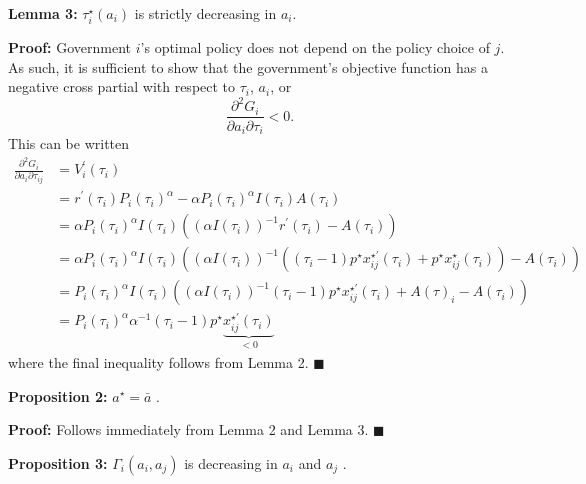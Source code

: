 \documentclass{puthesis}
\begin{document}
\textbf{Lemma 3:} \(\tau_i^\star(a_i)\) is strictly decreasing in
\(a_i\).

\textbf{Proof:} Government \(i\)'s optimal policy does not depend on the
policy choice of \(j\). As such, it is sufficient to show that the
government's objective function has a negative cross partial with
respect to \(\tau_i\), \(a_i\), or \[
\frac{\partial^2 G_i}{\partial a_i \partial \tau_{i}} < 0 .
\] This can be written \begin{align*}
\frac{\partial^2 G_i}{\partial a_i \partial \tau_{ij}} &= V_i^\prime(\tau_i) \\
&= r^\prime(\tau_i) P_i(\tau_i)^{\alpha} - \alpha P_i(\tau_i)^{\alpha} I(\tau_i) A(\tau_i) \\
&= \alpha P_i(\tau_i)^{\alpha} I(\tau_i) \left( (\alpha I(\tau_i))^{-1} r^\prime(\tau_i) - A(\tau_i) \right) \\ 
&= \alpha P_i(\tau_i)^{\alpha} I(\tau_i) \left( (\alpha I(\tau_i))^{-1} \left( (\tau_i - 1) p^\star x_{ij}^{\star \prime}(\tau_i) + p^\star x_{ij}^\star(\tau_i) \right) - A(\tau_i) \right) \\
&= P_i(\tau_i)^{\alpha} I(\tau_i) \left( (\alpha I(\tau_i))^{-1} (\tau_i - 1) p^\star x_{ij}^{\star \prime}(\tau_i) + A(\tau)_i - A(\tau_i) \right) \\
&= P_i(\tau_i)^{\alpha} \alpha^{-1} (\tau_i - 1) p^\star \underbrace{x_{ij}^{\star \prime}(\tau_i)}_{<0}
\end{align*} where the final inequality follows from Lemma 2.
\(\blacksquare\)

\textbf{Proposition 2:} \(a^\star = \bar{a}\) .

\textbf{Proof:} Follows immediately from Lemma 2 and Lemma 3.
\(\blacksquare\)

\textbf{Proposition 3:} \(\Gamma_i(a_i, a_j)\) is decreasing in \(a_i\)
and \(a_j\) .
\end{document}

